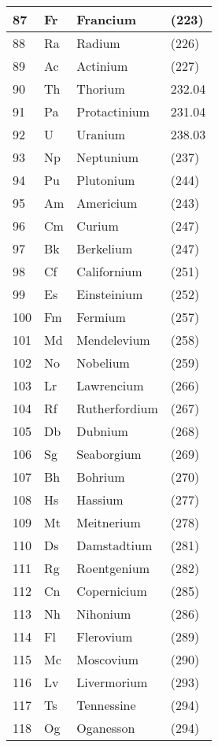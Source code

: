 \documentclass{article}
\begin{document}
\begin{center}
\begin{longtable}{|l|l|l|l|}
 \hline
 \hline
    87 & Fr & \cellcolor{alkalibeige}Francium & (223)\\
 \hline
    88 & Ra & \cellcolor{alkalineyellow}Radium & (226)\\
 \hline
    89 & Ac & \cellcolor{actipink}Actinium & (227)\\
 \hline
    90 & Th & \cellcolor{actipink}Thorium & 232.04\\
 \hline
    91 & Pa & \cellcolor{actipink}Protactinium & 231.04\\
 \hline
    92 & U & \cellcolor{actipink}Uranium & 238.03\\
 \hline
    93 & Np & \cellcolor{actipink}Neptunium & (237)\\
 \hline
    94 & Pu & \cellcolor{actipink}Plutonium & (244)\\
 \hline
    95 & Am & \cellcolor{actipink}Americium & (243)\\
 \hline
    96 & Cm & \cellcolor{actipink}Curium & (247)\\
 \hline
    97 & Bk & \cellcolor{actipink}Berkelium & (247)\\
 \hline
    98 & Cf & \cellcolor{actipink}Californium & (251)\\
 \hline
    99 & Es & \cellcolor{actipink}Einsteinium & (252)\\
 \hline
    100 & Fm & \cellcolor{actipink}Fermium & (257)\\
 \hline
    101 & Md & \cellcolor{actipink}Mendelevium & (258)\\
 \hline
    102 & No & \cellcolor{actipink}Nobelium & (259)\\
 \hline
    103 & Lr & \cellcolor{actipink}Lawrencium & (266)\\
 \hline
    104 & Rf & \cellcolor{transred}Rutherfordium & (267)\\
 \hline
    105 & Db & \cellcolor{transred}Dubnium & (268)\\
 \hline
    106 & Sg & \cellcolor{transred}Seaborgium & (269)\\
 \hline
    107 & Bh & \cellcolor{transred}Bohrium & (270)\\
 \hline
    108 & Hs & \cellcolor{transred}Hassium & (277)\\
 \hline
    109 & Mt & Meitnerium & (278)\\
 \hline
    110 & Ds & Damstadtium & (281)\\
 \hline
    111 & Rg & Roentgenium & (282)\\
 \hline
    112 & Cn & Copernicium & (285)\\
 \hline
    113 & Nh & Nihonium & (286)\\
 \hline
    114 & Fl & Flerovium & (289)\\
 \hline
    115 & Mc & Moscovium & (290)\\
 \hline
    116 & Lv & Livermorium & (293)\\
 \hline
    117 & Ts & Tennessine & (294)\\
 \hline
    118 & Og & Oganesson & (294)\\
 \hline
\end{longtable}
\end{center}
\end{document}
